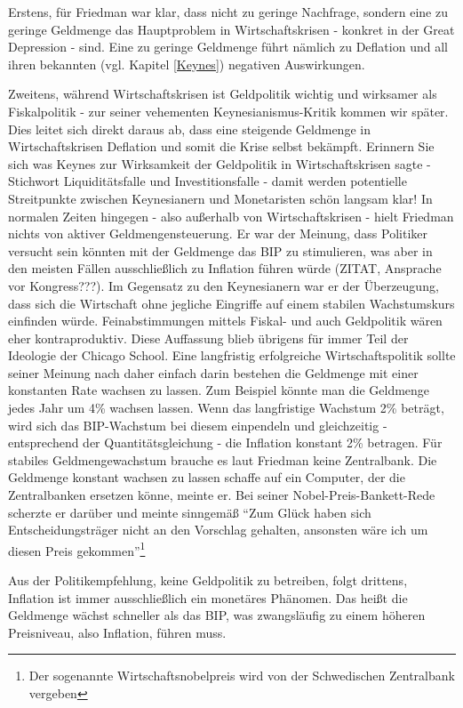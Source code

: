 Erstens, für Friedman war klar, dass nicht zu geringe Nachfrage, sondern eine zu geringe Geldmenge das Hauptproblem in Wirtschaftskrisen - konkret in der Great Depression - sind. Eine zu geringe Geldmenge führt nämlich zu Deflation und all ihren bekannten (vgl. Kapitel \ref{Keynes}) negativen Auswirkungen.

Zweitens, während Wirtschaftskrisen ist Geldpolitik wichtig und wirksamer als Fiskalpolitik - zur seiner vehementen Keynesianismus-Kritik kommen wir später. Dies leitet sich direkt daraus ab, dass eine steigende Geldmenge in Wirtschaftskrisen Deflation und somit die Krise selbst bekämpft. Erinnern Sie sich was Keynes zur Wirksamkeit der Geldpolitik in Wirtschaftskrisen sagte - Stichwort Liquiditätsfalle und Investitionsfalle - damit werden potentielle Streitpunkte zwischen Keynesianern und Monetaristen schön langsam klar!
In normalen Zeiten hingegen - also außerhalb von Wirtschaftskrisen - hielt Friedman nichts von aktiver Geldmengensteuerung. Er war der Meinung, dass Politiker versucht sein könnten mit der Geldmenge das BIP zu stimulieren, was aber in den meisten Fällen ausschließlich zu Inflation führen würde (ZITAT, Ansprache vor Kongress???). Im Gegensatz zu den Keynesianern war er der Überzeugung, dass sich die Wirtschaft ohne jegliche Eingriffe auf einem stabilen Wachstumskurs einfinden würde. Feinabstimmungen mittels Fiskal- und auch Geldpolitik wären eher kontraproduktiv. Diese Auffassung blieb übrigens für immer Teil der Ideologie der Chicago School. Eine langfristig erfolgreiche Wirtschaftspolitik sollte seiner Meinung nach daher einfach darin bestehen die Geldmenge mit einer konstanten Rate wachsen zu lassen. Zum Beispiel könnte man die Geldmenge jedes Jahr um 4\% wachsen lassen. Wenn das langfristige Wachstum 2\% beträgt, wird sich das BIP-Wachstum bei diesem einpendeln und gleichzeitig - entsprechend der Quantitätsgleichung - die Inflation konstant 2\% betragen. Für stabiles Geldmengewachstum brauche es laut Friedman keine Zentralbank. Die Geldmenge konstant wachsen zu lassen schaffe auf ein Computer, der die Zentralbanken ersetzen könne, meinte er. Bei seiner Nobel-Preis-Bankett-Rede \parencite{Friedman1976b} scherzte er darüber und meinte sinngemäß "`Zum Glück haben sich Entscheidungsträger nicht an den Vorschlag gehalten, ansonsten wäre ich um diesen Preis gekommen"'\footnote{Der sogenannte Wirtschaftsnobelpreis wird von der Schwedischen Zentralbank vergeben}

Aus der Politikempfehlung, keine Geldpolitik zu betreiben, folgt drittens, Inflation ist immer ausschließlich ein monetäres Phänomen. Das heißt die Geldmenge wächst schneller als das BIP, was zwangsläufig zu einem höheren Preisniveau, also Inflation, führen muss.


